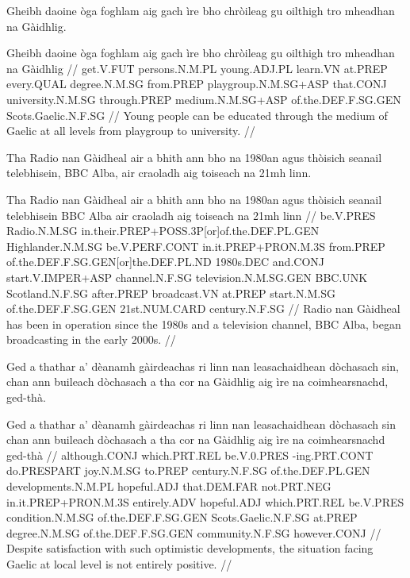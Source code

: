 \documentclass[a4paper,10pt]{article}
\begin{document}
\ex
\begingl
\glpre Gheibh daoine òga foghlam aig gach ìre bho chròileag gu oilthigh tro mheadhan na Gàidhlig. 

\vspace{4mm}
\gla Gheibh daoine òga foghlam aig gach ìre bho chròileag gu oilthigh tro mheadhan na Gàidhlig  //
\glb get.V.FUT persons.N.M.PL young.ADJ.PL learn.VN at.PREP every.QUAL degree.N.M.SG from.PREP playgroup.N.M.SG+ASP that.CONJ university.N.M.SG through.PREP medium.N.M.SG+ASP of.the.DEF.F.SG.GEN Scots.Gaelic.N.F.SG  //
\glft Young people can be educated through the medium of Gaelic at all levels from playgroup to university. //
\endgl
\xe

\ex
\begingl
\glpre Tha Radio nan Gàidheal air a bhith ann bho na 1980an agus thòisich seanail telebhisein, BBC Alba, air craoladh aig toiseach na 21mh linn. 

\vspace{4mm}
\gla Tha Radio nan Gàidheal {air a bhith} ann bho na 1980an agus thòisich seanail telebhisein BBC Alba air craoladh aig toiseach na 21mh linn  //
\glb be.V.PRES Radio.N.M.SG in.their.PREP+POSS.3P[or]of.the.DEF.PL.GEN Highlander.N.M.SG be.V.PERF.CONT in.it.PREP+PRON.M.3S from.PREP of.the.DEF.F.SG.GEN[or]the.DEF.PL.ND 1980s.DEC and.CONJ start.V.IMPER+ASP channel.N.F.SG television.N.M.SG.GEN BBC.UNK Scotland.N.F.SG after.PREP broadcast.VN at.PREP start.N.M.SG of.the.DEF.F.SG.GEN 21st.NUM.CARD century.N.F.SG  //
\glft Radio nan Gàidheal has been in operation since the 1980s and a television channel, BBC Alba, began broadcasting in the early 2000s. //
\endgl
\xe

\ex
\begingl
\glpre Ged a thathar a' dèanamh gàirdeachas ri linn nan leasachaidhean dòchasach sin, chan ann buileach dòchasach a tha cor na Gàidhlig aig ìre na coimhearsnachd, ged-thà. 

\vspace{4mm}
\gla Ged a thathar a' dèanamh gàirdeachas ri linn nan leasachaidhean dòchasach sin chan ann buileach dòchasach a tha cor na Gàidhlig aig ìre na coimhearsnachd ged-thà  //
\glb although.CONJ which.PRT.REL be.V.0.PRES -ing.PRT.CONT do.PRESPART joy.N.M.SG to.PREP century.N.F.SG of.the.DEF.PL.GEN developments.N.M.PL hopeful.ADJ that.DEM.FAR not.PRT.NEG in.it.PREP+PRON.M.3S entirely.ADV hopeful.ADJ which.PRT.REL be.V.PRES condition.N.M.SG of.the.DEF.F.SG.GEN Scots.Gaelic.N.F.SG at.PREP degree.N.M.SG of.the.DEF.F.SG.GEN community.N.F.SG however.CONJ  //
\glft Despite satisfaction with such optimistic developments, the situation facing Gaelic at local level is not entirely positive. //
\endgl
\xe
\end{document}
